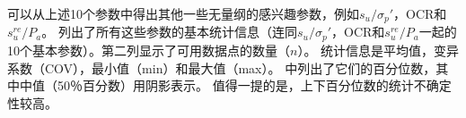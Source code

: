 \begin{paracol}{2}
    \switchcolumn
    
    可以从上述10个参数中得出其他一些无量纲的感兴趣参数，例如$s_u/\sigma_p'$，OCR和$s_u^{re}/P_a$。 列出了所有这些参数的基本统计信息（连同$s_u/\sigma_p'$，OCR和$s_u^{re}/P_a$一起的10个基本参数）。第二列显示了可用数据点的数量（$n$）。 统计信息是平均值，变异系数（COV），最小值（min）和最大值（max）。 中列出了它们的百分位数，其中中值（50％百分数）用阴影表示。 值得一提的是，上下百分位数的统计不确定性较高。
        
    
\end{paracol}
